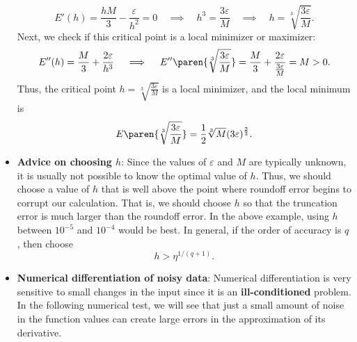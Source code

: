 \documentclass{report}
\begin{document}
\begin{itemize}
            $$E'(h) = \frac{hM}{3} - \frac{\varepsilon}{h^2} = 0 \quad \implies \quad h^3 = \frac{3\varepsilon}{M} \quad \implies \quad h = \sqrt[3]{\frac{3\varepsilon}{M}}.$$
            \bigbreak \noindent 
            Next, we check if this critical point is a local minimizer or maximizer:
            $$E''(h) = \frac{M}{3} + \frac{2\varepsilon}{h^3} \quad \implies \quad E''\paren{\sqrt[3]{\frac{3\varepsilon}{M}}} = \frac{M}{3} + \frac{2\varepsilon}{\frac{3\varepsilon}{M}} = M > 0.$$
            Thus, the critical point $h = \sqrt[3]{\frac{3\varepsilon}{M}}$ is a local minimizer, and the local minimum is
            $$E\paren{\sqrt[3]{\frac{3\varepsilon}{M}}} = \frac{1}{2}  \sqrt[3]{M} (3\varepsilon)^{\frac{2}{3}}.$$
        \item \textbf{Advice on choosing $h$}:
            Since the values of $\varepsilon$ and $M$ are typically unknown, it is usually not possible to know the optimal value of $h$.
            \bigbreak \noindent 
            Thus, we should choose a value of $h$ that is well above the point where roundoff error begins to corrupt our calculation.
            \bigbreak \noindent 
            That is, we should choose $h$ so that the truncation error is much larger than the roundoff error.
            \bigbreak \noindent 
            In the above example, using $h$ between $10^{-5}$ and $10^{-4}$ would be best.
            \bigbreak \noindent 
            In general, if the order of accuracy is $q$, then choose
            $$h > \eta^{1/(q+1)}.$$
        \item \textbf{Numerical differentiation of noisy data}:
            Numerical differentiation is very sensitive to small changes in the input since it is an \textbf{ill-conditioned} problem.
            \bigbreak \noindent 
            In the following numerical test, we will see that just a small amount of noise in the function values can create large errors in the approximation of its derivative.





     \end{itemize}

     \pagebreak 
\end{document}
